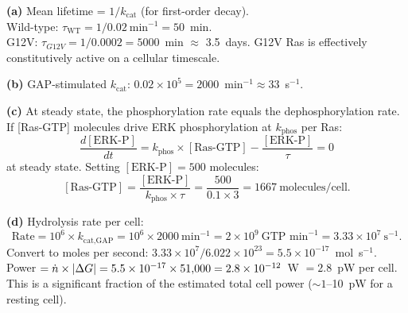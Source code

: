 \documentclass[12pt, a4paper, oneside]{report}
\begin{document}
\begin{solution}
  \textbf{(a)} Mean lifetime = $1/k_\text{cat}$ (for first-order decay).\\
  Wild-type: $\tau_\text{WT} = 1/0.02~\text{min}^{-1} = 50$~min.\\
  G12V: $\tau_{G12V} = 1/0.0002 = 5000$~min $\approx$ 3.5~days.
  G12V Ras is effectively constitutively active on a cellular timescale.

  \textbf{(b)} GAP-stimulated $k_\text{cat}$:
  $0.02 \times 10^5 = 2000$~min$^{-1} \approx 33$~s$^{-1}$.

  \textbf{(c)} At steady state, the phosphorylation rate equals the
  dephosphorylation rate. If [Ras-GTP] molecules drive ERK phosphorylation
  at $k_\text{phos}$ per Ras:
  \[
    \frac{d[\text{ERK-P}]}{dt} = k_\text{phos} \times [\text{Ras-GTP}]
    - \frac{[\text{ERK-P}]}{\tau} = 0
  \]
  at steady state. Setting $[\text{ERK-P}] = 500$ molecules:
  \[
    [\text{Ras-GTP}] = \frac{[\text{ERK-P}]}{k_\text{phos}\times\tau}
    = \frac{500}{0.1 \times 3} = 1667~\text{molecules/cell}.
  \]

  \textbf{(d)} Hydrolysis rate per cell:
  \[
    \text{Rate} = 10^6 \times k_\text{cat,GAP} = 10^6 \times 2000~\text{min}^{-1}
    = 2\times10^9~\text{GTP~min}^{-1} = 3.33\times10^7~\text{s}^{-1}.
  \]
  Convert to moles per second: $3.33\times10^7 / 6.022\times10^{23}
  = 5.5\times10^{-17}$~mol~s$^{-1}$.\\
  Power $= \dot{n} \times |\Delta G| = 5.5\times10^{-17} \times 51{,}000
  = 2.8\times10^{-12}$~W $= 2.8$~pW per cell.
  This is a significant fraction of the estimated total cell power
  ($\sim1$--10~pW for a resting cell).
\end{solution}

\end{document}
